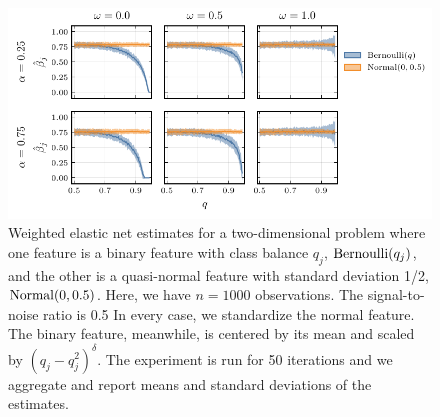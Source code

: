 \begin{figure}[htpb]
  \centering
  \includegraphics{plots/mixed_data_elnet.pdf}
  \caption{%
    Weighted elastic net estimates for a two-dimensional problem where one feature is a binary
    feature with class balance \(q_j\), \(\operatorname{Bernoulli}(q_j)\), and the other is a quasi-normal
    feature with standard deviation 1/2, \(\operatorname{Normal}(0, 0.5)\). Here, we have \(n = \num{1000}\)
    observations. The signal-to-noise ratio is 0.5 In every case, we standardize the normal
    feature. The binary feature, meanwhile, is centered by its mean and scaled by
    \((q_j-q_j^2)^\delta\). The experiment is run for 50 iterations and we aggregate and report
    means and standard deviations of the estimates. \label{fig:mixed-data-elnet}
  }
\end{figure}

